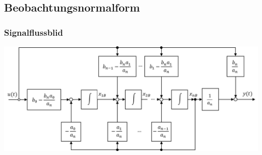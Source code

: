 



\subsection{Beobachtungsnormalform}
\subsubsection{Signalflussblid}
		\begin{center}
			\includegraphics[scale = 0.5]{images/BNF_Signalflussblid.png}
		\end{center}
